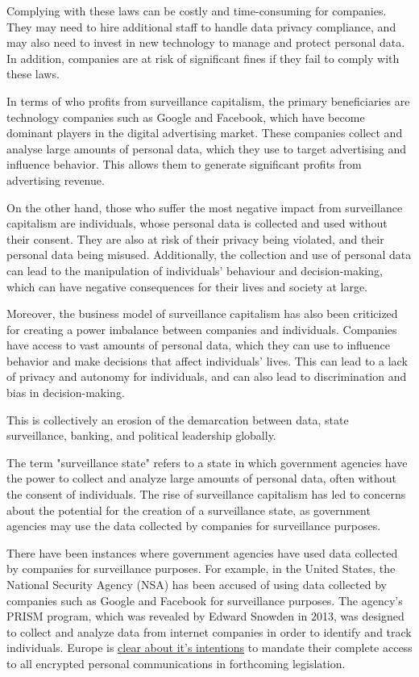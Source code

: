 Complying with these laws can be costly and time-consuming for companies. They may need to hire additional staff to handle data privacy compliance, and may also need to invest in new technology to manage and protect personal data. In addition, companies are at risk of significant fines if they fail to comply with these laws.\par
In terms of who profits from surveillance capitalism, the primary beneficiaries are technology companies such as Google and Facebook, which have become dominant players in the digital advertising market. These companies collect and analyse large amounts of personal data, which they use to target advertising and influence behavior. This allows them to generate significant profits from advertising revenue.\par
On the other hand, those who suffer the most negative impact from surveillance capitalism are individuals, whose personal data is collected and used without their consent. They are also at risk of their privacy being violated, and their personal data being misused. Additionally, the collection and use of personal data can lead to the manipulation of individuals' behaviour and decision-making, which can have negative consequences for their lives and society at large.\par
Moreover, the business model of surveillance capitalism has also been criticized for creating a power imbalance between companies and individuals. Companies have access to vast amounts of personal data, which they can use to influence behavior and make decisions that affect individuals' lives. This can lead to a lack of privacy and autonomy for individuals, and can also lead to discrimination and bias in decision-making.\par 
This is collectively an erosion of the demarcation between data, state surveillance, banking, and political leadership globally.\par
The term "surveillance state" refers to a state in which government agencies have the power to collect and analyze large amounts of personal data, often without the consent of individuals. The rise of surveillance capitalism has led to concerns about the potential for the creation of a surveillance state, as government agencies may use the data collected by companies for surveillance purposes.\par 
There have been instances where government agencies have used data collected by companies for surveillance purposes. For example, in the United States, the National Security Agency (NSA) has been accused of using data collected by companies such as Google and Facebook for surveillance purposes. The agency's PRISM program, which was revealed by Edward Snowden in 2013, was designed to collect and analyze data from internet companies in order to identify and track individuals. Europe is \href{https://www.patrick-breyer.de/en/posts/chat-control/}{clear about it's intentions} to mandate their complete access to all encrypted personal communications in forthcoming legislation.\par

